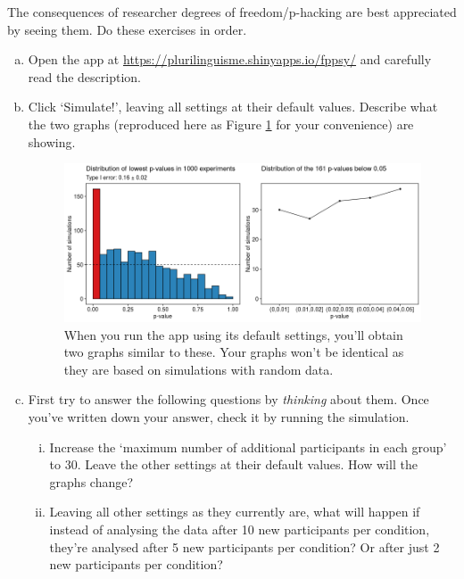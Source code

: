 \documentclass[a4paper]{tufte-book}\usepackage[]{graphicx}\usepackage[]{xcolor}
\begin{document}
\label{ex:fpp}
The consequences of researcher degrees of freedom/p-hacking are
best appreciated by seeing them. Do these exercises in order.

\begin{enumerate}[(a)]
  \item Open the app at \url{https://plurilinguisme.shinyapps.io/fppsy/}
  and carefully read the description.
  
  \item Click `Simulate!', leaving all settings at their default values.
  Describe what the two graphs (reproduced here as Figure \ref{fig:app} for your convenience) are showing.
  
\begin{figure}
\centering
\includegraphics[width=\textwidth]{figure/app}
\caption{When you run the app using its default settings, you'll obtain two graphs similar to these. Your graphs won't be identical as they are based on simulations with random data.}
\label{fig:app}
\end{figure}
  
  \item First try to answer the following questions by \emph{thinking}
  about them. Once you've written down your answer, check it by
  running the simulation.
  
  \begin{enumerate}[i.]
    \item Increase the `maximum number of additional participants in each group' to 30. Leave the other settings at their default values. How will the graphs change?
    
    \item Leaving all other settings as they currently are, what will
    happen if instead of analysing the data after 10 new participants
    per condition, they're analysed after 5 new participants per
    condition? Or after just 2 new participants per condition?
    

\end{enumerate}
\end{enumerate}
\end{document}
